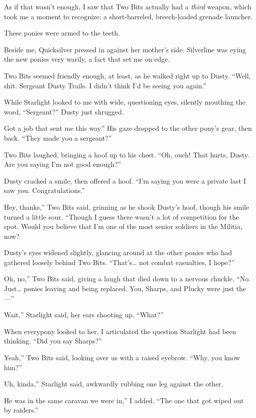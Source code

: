 As if that wasn’t enough, I saw that Two Bits actually had a \textit{third} weapon, which took me a moment to recognize: a short-barreled, breech-loaded grenade launcher.

These ponies were armed to the teeth.

Beside me, Quicksilver pressed in against her mother’s side. Silverline was eying the new ponies very warily, a fact that set me on edge.

Two Bits seemed friendly enough, at least, as he walked right up to Dusty. “Well, shit. Sergeant Dusty Trails. I didn’t think I’d be seeing you again.”

While Starlight looked to me with wide, questioning eyes, silently mouthing the word, “Sergeant?” Dusty just shrugged.

\leavevmode{}Got a job that sent me this way.” His gaze dropped to the other pony’s gear, then back. “They made you a sergeant?”

Two Bits laughed, bringing a hoof up to his chest. “Oh, ouch! That hurts, Dusty. Are you saying I’m not good enough?”

Dusty cracked a smile, then offered a hoof. “I’m saying you were a private last I saw you. Congratulations.”

\leavevmode{}Hey, thanks,” Two Bits said, grinning as he shook Dusty’s hoof, though his smile turned a little sour. “Though I guess there wasn’t a lot of competition for the spot. Would you believe that I’m one of the most senior soldiers in the Militia, now?

Dusty’s eyes widened slightly, glancing around at the other ponies who had gathered loosely behind Two Bits. “That’s… not combat casualties, I hope?”

\leavevmode{}Oh, no,” Two Bits said, giving a laugh that died down to a nervous chuckle. “No. Just… ponies leaving and being replaced. You, Sharps, and Plucky were just the—”

\leavevmode{}Wait,” Starlight said, her ears shooting up. “What?”

When everypony looked to her, I articulated the question Starlight had been thinking. “Did you say Sharps?”

\leavevmode{}Yeah,” Two Bits said, looking over us with a raised eyebrow. “Why, you know him?”

\leavevmode{}Uh, kinda,” Starlight said, awkwardly rubbing one leg against the other.

\leavevmode{}He was in the same caravan we were in,” I added. “The one that got wiped out by raiders.”


